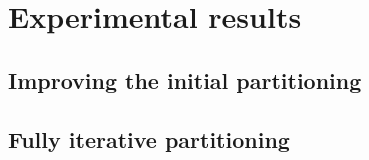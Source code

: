 \chapter{Experimental results} \label{chap:experimental_results}
\section{Improving the initial partitioning}
\section{Fully iterative partitioning}



